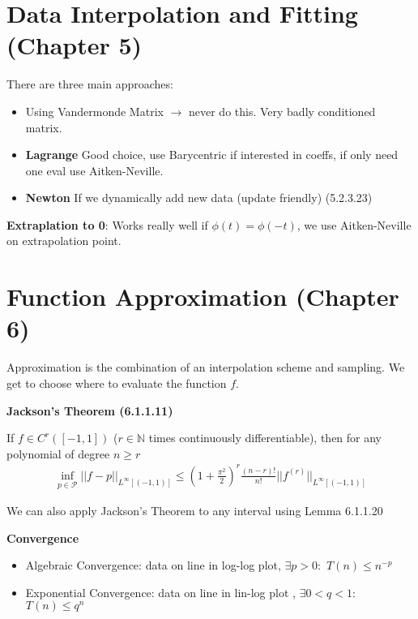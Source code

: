 \documentclass{sciposter}
\newcommand{\TODO}[1]{\todo[inline, color=red!40]{#1}}
\newenvironment{method}[1]{\begin{mdframed}[backgroundcolor=blue!10,innertopmargin=15pt, innerbottommargin=15pt, nobreak=true]
		\textbf{#1 }
	}
	{ 
	\end{mdframed}
}
\newcommand{\psection}[1]{\par \textbf{\large#1}}
\begin{document}
\begin{multicols}{2}
\section*{Data Interpolation and Fitting (Chapter 5)}


There are three main approaches:

\begin{itemize}
	\item Using Vandermonde Matrix $\rightarrow$ never do this. Very badly conditioned matrix.
	\item \textbf{Lagrange} Good choice, use Barycentric if interested in coeffs, if only need one eval use Aitken-Neville.
	\item \textbf{Newton} If we dynamically add new data (update friendly) (5.2.3.23)
\end{itemize}


\textbf{Extraplation to 0}: Works really well if $\phi(t) = \phi(-t)$, we use Aitken-Neville on extrapolation point.


\TODO{local interpolation}




\section*{Function Approximation (Chapter 6)}

Approximation is the combination of an interpolation scheme and sampling. We get to choose where to evaluate the function $f$.

\begin{method}{Jackson's Theorem (6.1.1.11)}
	If $f\in C^r([-1,1])$ ($r\in \mathbb{N}$ times continuously differentiable), then for any polynomial of degree $n \geq r$
	\begin{align*}
		\inf_{p \in \mathcal{P}} || f-p ||_{L^\infty [(-1,1)]} \leq (1 + \frac{\pi^2}{2})^r \frac{(n-r)!}{n!} || f^{(r)} ||_{L^\infty [(-1,1)]}
	\end{align*}
\end{method}

We can also apply Jackson's Theorem to any interval using Lemma 6.1.1.20



\psection{Convergence}


\begin{itemize}
\item Algebraic Convergence: data on line in log-log plot, $\exists p > 0:$  $T(n) \leq n^{-p}$

\item Exponential Convergence: data on line in lin-log plot , $\exists 0 < q < 1:$  $T(n) \leq q^n$


\end{itemize}
\end{multicols}
\end{document}
